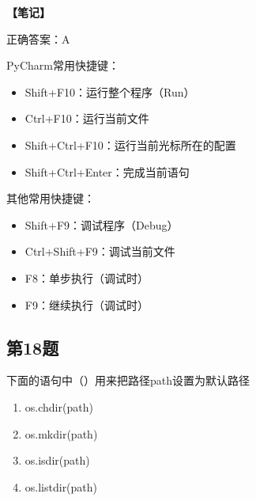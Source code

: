 \begin{mdframed}[linewidth=1pt, linecolor=black]

  \textbf{\color{red}【笔记】}

  正确答案：A

  PyCharm常用快捷键：
  \begin{itemize}
    \item Shift+F10：运行整个程序（Run）
    \item Ctrl+F10：运行当前文件
    \item Shift+Ctrl+F10：运行当前光标所在的配置
    \item Shift+Ctrl+Enter：完成当前语句
  \end{itemize}

  其他常用快捷键：
  \begin{itemize}
    \item Shift+F9：调试程序（Debug）
    \item Ctrl+Shift+F9：调试当前文件
    \item F8：单步执行（调试时）
    \item F9：继续执行（调试时）
  \end{itemize}

\end{mdframed}

\subsection{第18题}
下面的语句中（）用来把路径path设置为默认路径

\begin{enumerate}[label=\Alph*.]
  \item os.chdir(path)
  \item os.mkdir(path)
  \item os.isdir(path)
  \item os.listdir(path)
\end{enumerate}

